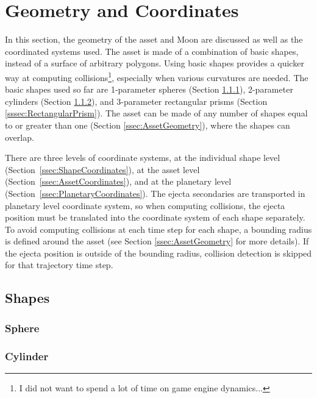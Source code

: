 \documentclass{article}
\begin{document}
\section{Geometry and Coordinates}

In this section, the geometry of the asset and Moon are discussed as well as the coordinated systems used. The asset is made of a combination of basic shapes, instead of a surface of arbitrary polygons. Using basic shapes provides a quicker way at computing collisions\footnote{I did not want to spend a lot of time on game engine dynamics...}, especially when various curvatures are needed. The basic shapes used so far are 1-parameter spheres (Section \ref{sssec:Sphere}), 2-parameter cylinders (Section \ref{sssec:Cylinder}), and 3-parameter rectangular prisms (Section \ref{sssec:RectangularPrism}). The asset can be made of any number of shapes equal to or greater than one (Section \ref{ssec:AssetGeometry}), where the shapes can overlap.

There are three levels of coordinate systems, at the individual shape level (Section~\ref{ssec:ShapeCoordinates}), at the asset level (Section~\ref{ssec:AssetCoordinates}), and at the planetary level (Section~\ref{ssec:PlanetaryCoordinates}). The ejecta secondaries are transported in planetary level coordinate system, so when computing collisions, the ejecta position must be translated into the coordinate system of each shape separately. To avoid computing collisions at each time step for each shape, a bounding radius is defined around the asset (see Section \ref{ssec:AssetGeometry} for more details). If the ejecta position is outside of the bounding radius, collision detection is skipped for that trajectory time step.

\subsection{Shapes}




\subsubsection{Sphere}
\label{sssec:Sphere}


\subsubsection{Cylinder}
\label{sssec:Cylinder}
\end{document}
